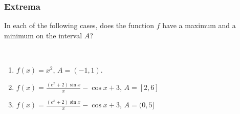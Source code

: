 \documentclass[14pt]{beamer}
\newcommand {\DS} [1] {${\displaystyle #1}$}
\begin{document}
\begin{frame}
\frametitle{Extrema}

In each of the following cases, does the function $f$ have a maximum and a minimum on the interval $A$?

\

\begin{enumerate}
	\item  \DS{f(x) = x^2}, \quad \DS{A = (-1,1)}.
	\item   \DS{f(x) = \frac{(e^x + 2) \sin x}{x} - \cos x + 3 }, \quad  \DS{A = [2,6]}
	\item   \DS{f(x) = \frac{(e^x + 2) \sin x}{x} - \cos x + 3 }, \quad  \DS{A = (0,5]}
\end{enumerate}



\end{frame}
\end{document}
